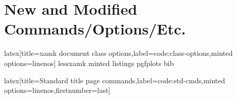 \section{New and Modified Commands/Options/Etc.}

\begin{code}{latex}[title={xamk document class options},label=code:class-options,minted options={linenos}]
lessxamk
minted
listings
pgfplots
bib
\end{code}
%
\begin{code}{latex}[title={Standard title page commands},label=code:std-cmds,minted options={linenos,firstnumber=last}]
\maketitle
\end{code}
%
